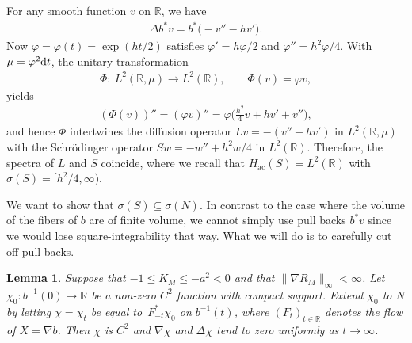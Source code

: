 \documentclass[pdftex]{sigma}
\numberwithin{equation}{section}
\newtheorem{Lemma}[Theorem]{Lemma}
\def\ac{\mathrm{ac}}
\def\R{\mathbb R}
\def\vf{\varphi}
\begin{document}
For any smooth function $v$ on $\R$, we have
\begin{align*}
	\Delta b^*v = b^*\bigl(-v'' - hv'\bigr).
\end{align*}
Now $\vf=\vf(t)=\exp(ht/2)$ satisfies $\vf'=h\vf/2$ and $\vf''=h^2\vf/4$.
With $\mu=\vf^2{\rm d}t$, the unitary transformation
\begin{align*}
	\Phi \colon \ L^2(\R,\mu) \to L^2(\R), \qquad \Phi(v) = \vf v,
\end{align*}
yields
\begin{align*}
	(\Phi(v))'' = (\vf v)'' = \vf\biggl(\frac{h^2}4v + hv' + v''\biggr),
\end{align*}
and hence $\Phi$ intertwines the diffusion operator $Lv=-(v''+hv')$ in $L^2(\R,\mu)$
with the Schr\"odinger operator $Sw=-w''+h^2w/4$ in $L^2(\R)$.
Therefore, the spectra of $L$ and $S$ coincide,
where we recall that $H_{\ac}(S)=L^2(\R)$ with $\sigma(S)=\bigl[h^2/4,\infty\bigr)$.

We want to show that $\sigma(S)\subseteq\sigma(N)$.
In contrast to the case where the volume of the fibers of $b$ are of finite volume,
we cannot simply use pull backs $b^*v$ since we would lose square-integrability that way.
What we will do is to carefully cut off pull-backs.

\begin{Lemma}
Suppose that $-1\le K_M\le-a^2<0$ and that $\|\nabla R_M\|_\infty<\infty$.
Let $\chi_0\colon b^{-1}(0)\to\R$ be a non-zero $C^2$ function with compact support.
Extend $\chi_0$ to $N$ by letting $\chi=\chi_t$ be equal to~$F_{-t}^*\chi_0$ on $b^{-1}(t)$,
where $(F_t)_{t\in\R}$ denotes the flow of $X=\nabla b$.
Then $\chi$ is $C^2$ and $\nabla\chi$ and $\Delta\chi$ tend to zero uniformly as $t\to\infty$.
\end{Lemma}
\end{document}
